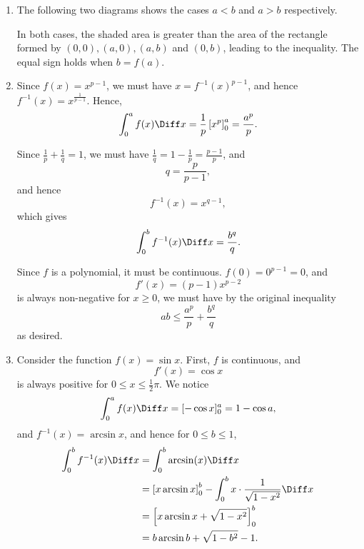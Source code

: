 \Question{\currfilebase}

\begin{enumerate}
    \item The following two diagrams shows the cases \(a < b\) and \(a > b\) respectively.
          \begin{center}
              
              
          \end{center}

          In both cases, the shaded area is greater than the area of the rectangle formed by \((0, 0), (a, 0), (a, b)\) and \((0, b)\), leading to the inequality. The equal sign holds when \(b = f(a)\).
    \item Since \(f(x) = x^{p - 1}\), we must have \(x = f^{-1}(x)^{p - 1}\), and hence \(f^{-1}(x) = x^{\frac{1}{p - 1}}\). Hence,
          \[
              \int_{0}^{a} f(x) \Diff x = \frac{1}{p} \left[x^p\right]_{0}^{a} = \frac{a^p}{p}.
          \]

          Since \(\frac{1}{p} + \frac{1}{q} = 1\), we must have \(\frac{1}{q} = 1 - \frac{1}{p} = \frac{p - 1}{p}\), and
          \[
              q = \frac{p}{p - 1},
          \]
          and hence
          \[
              f^{-1}(x) = x^{q - 1},
          \]
          which gives
          \[
              \int_{0}^{b} f^{-1}(x) \Diff x = \frac{b^q}{q}.
          \]

          Since \(f\) is a polynomial, it must be continuous. \(f(0) = 0^{p - 1} = 0\), and
          \[
              f'(x) = (p - 1) x^{p - 2}
          \]
          is always non-negative for \(x \geq 0\), we must have by the original inequality
          \[
              ab \leq \frac{a^p}{p} + \frac{b^q}{q}
          \]
          as desired.

    \item Consider the function \(f(x) = \sin x\). First, \(f\) is continuous, and
          \[
              f'(x) = \cos x
          \]
          is always positive for \(0 \leq x \leq \frac{1}{2} \pi\). We notice
          \[
              \int_{0}^{a} f(x) \Diff x = [-\cos x]_{0}^{a} = 1 - \cos a,
          \]
          and \(f^{-1}(x) = \arcsin x\), and hence for \(0 \leq b \leq 1\),
          \begin{align*}
              \int_{0}^{b} f^{-1}(x) \Diff x & = \int_{0}^{b} \arcsin(x) \Diff x                                                          \\
                                             & = \left[x \arcsin x\right]_{0}^{b} - \int_{0}^{b} x \cdot \frac{1}{\sqrt{1 - x^2}} \Diff x \\
                                             & = \left[x \arcsin x + \sqrt{1 - x^2}\right]_{0}^{b}                                        \\
                                             & = b \arcsin b + \sqrt{1 - b^2} - 1.
          \end{align*}


\end{enumerate}
